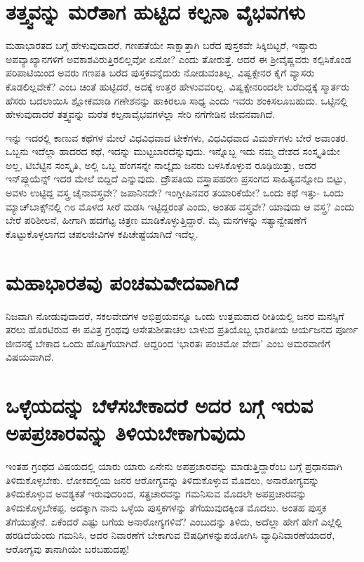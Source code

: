 \section*{ತತ್ತ್ವವನ್ನು ಮರೆತಾಗ ಹುಟ್ಟಿದ ಕಲ್ಪನಾ ವೈಭವಗಳು}

ಮಹಾಭಾರತದ ಬಗ್ಗೆ ಹೇಳುವುದಾದರೆ, ಗಣಪತೆಯೇ ಸಾಕ್ಷಾತ್ತಾಗಿ ಬರೆದ ಪುಸ್ತಕವೇ ಸಿಕ್ಕಿಬಿಟ್ಟರೆ, ಇಷ್ಟಾರು ಅಪವ್ಯಾಖ್ಯಾನಗಳಿಗೆ ಅವಕಾಶವಿರುತ್ತಿರಲಿಲ್ಲವೋ ಏನೋ? ಎಂದು ತೋರುತ್ತೆ. ಆದರೆ ಈ ಶ್ರೀವೈಷ್ಣವರು ಕಲ್ಪಿಸಿಕೊಂಡ ಪರಿಪಾಟಿಯಿಂದ ಅವರು ಗಣಪತಿ ಬರೆದ ಪುಸ್ತಕವನ್ನೆದುರು ನೋಡುವಂತಿಲ್ಲ. ವಿಷ್ವಕ್ಸೇನರ ಕೈಗೆ ವ್ಯಾಸರು ಕೊಡಲಿಲ್ಲವೇಕೆ? ಎಂಬ ಚಿಂತೆ ಹುಟ್ಟಿದರೆ, ಅದಕ್ಕೆ ಉತ್ತರ ಹೇಳುವವರಿಲ್ಲ. ವಿಷ್ವಕ್ಸೇನರಿಂದಲೇ ಬರೆದಿದ್ದಕ್ಕೆ ಸ್ಮಾರ್ತರು ಹೆಸರು ಬದಲಾಯಿಸಿ ಶ್ಲೋಕಮಾಡಿ ಗಣೇಶನನ್ನು ಹಾಕಿರಲೂ ಸಾಧ್ಯ ಎಂದು ಇವರು ಶಂಕಿಸಲೂಬಹುದು. ಒಟ್ಟಿನಲ್ಲಿ ಹೇಳುವುದಾದರೆ ತತ್ತ್ವವನ್ನು ಮರೆತ ಕಲ್ಪನಾವೈಭವಗಳೆಲ್ಲಾ ಸೇರಿ ನಗೆಗೇಡಿನ ಜೀವನವಾಗಿದೆ.

ಇನ್ನು ಇದರಲ್ಲಿ ಕಾಣುವ ಕಥೆಗಳ ಮೇಲೆ ವಿಧವಿಧವಾದ ಟೀಕೆಗಳು, ವಿಧವಿಧವಾದ ವಿಮರ್ಶೆಗಳು ಬೇರೆ ಅವಾಂತರ. ಒಬ್ಬನು ಇದೆಲ್ಲಾ ಹಾದರದ ಕಥೆ, ಇದನ್ನು ಮುಟ್ಟಬಾರದೆನ್ನುವುದು. ಇನ್ನೊಬ್ಬ ಇದು ನಮ್ಮ ದೇಶದ ಸಂಸ್ಕೃತಿಯೇ ಅಲ್ಲ, ಟಿಬೆಟ್ಟಿನ ಸಂಸ್ಕೃತಿ, ಅಲ್ಲಿ ಒಬ್ಬ ಹೆಂಗಸನ್ನೇ ನಾಲ್ಕೈದು ಜನರು ಬಳಸಿಕೊಳ್ಳುವ ರೂಢಿಯಿತ್ತು, ಅದರ ಇನ್‌ಪ್ಲುಯೆನ್ಸ್ ಇದರ ಮೇಲೆ ಬಿದ್ದಿದೆ ಎನ್ನುವುದು. ದ್ರೌಪತಿಯ ವಸ್ತ್ರಾಪಹರಣ ಪ್ರಸಂಗದ ಸಾಹಿತ್ಯವನ್ನೋದಿ ಬಿಟ್ಟು, ಅವಳು ಉಟ್ಟಿದ್ದ ವಸ್ತ್ರ ಚೈನಾವಸ್ತ್ರವೇ? ಜಪಾನಿನದೇ? ಇಂಗ್ಲೀಷಿನವರ ತಯಾರಿಕೆಯೇ? ಒಂದು ಕಥೆ ಇತ್ತು- ಒಂದು ಮ್ಯಾಚ್‌ಬಾಕ್ಸ್‌ನಲ್ಲಿ ೧೮ ಮೊಳದ ಸೀರೆ ಮಡಸಿ ಇಟ್ಟಿದ್ದರಂತೆ ಎಂದು, ಅಂತಹ ವಸ್ತ್ರವೇ? ಯಾವುದು ಆ ವಸ್ತ್ರ? ಎಂದು ಬೇರೆ ಪರಿಶೀಲನೆ, ಹೀಗಾಗಿ ಹದಗೆಟ್ಟ ಚಿತ್ರಣ ಮಾಡಿಕೊಳ್ಳುತ್ತಿದ್ದಾರೆ. ಮೈ ಮನಗಳನ್ನು ಸತ್ಯಾನ್ವೇಷಣೆಗೆ ಕೊಟ್ಟುಕೊಳ್ಳಲಾಗದ ಚಪಲಜೀವಿಗಳ ಕಪಿಚೇಷ್ಟೆಯಾಗಿದೆ ಇದೆಲ್ಲ.

\section*{ಮಹಾಭಾರತವು ಪಂಚಮವೇದವಾಗಿದೆ}

ನಿಜವಾಗಿ ನೋಡುವುದಾದರೆ, ಸಕಲವೇದಗಳ ಅಭಿಪ್ರಯವನ್ನೂ ಒಂದು ಉತ್ತಮವಾದ ರೀತಿಯಲ್ಲಿ ಜನರ ಮನಸ್ಸಿಗೆ ತರಲು ಹೊರಟಿರುವ ಈ ಪವಿತ್ರ ಗ್ರಂಥವು ಆಸೇತುಶೀತಾಚಲ ಬಾಳುವ ಪ್ರತಿಯೊಬ್ಬ ಭಾರತೀಯ ಆರ್ಯಜನದ ಪೂರ್ಣ ಜೀವನಕ್ಕೆ ಬೇಕಾದ ಒಂದು ಹೊತ್ತಿಗೆಯಾಗಿದೆ. ಆದ್ದರಿಂದ `ಭಾರತಃ ಪಂಚಮೋ ವೇದಃ'\label{122} ಎಂಬ ಅಮರವಾಣಿಗೆ ವಿಷಯವಾಗಿದೆ.

\section*{ಒಳ್ಳೆಯದನ್ನು ಬೆಳೆಸಬೇಕಾದರೆ ಅದರ ಬಗ್ಗೆ ಇರುವ ಅಪಪ್ರಚಾರವನ್ನು ತಿಳಿಯಬೇಕಾಗುವುದು}

ಇಂತಹ ಗ್ರಂಥದ ವಿಷಯದಲ್ಲಿ ಯಾರು ಯಾರು ಏನೇನು ಅಪಪ್ರಚಾರವನ್ನು ಮಾಡುತ್ತಿದ್ದಾರೆಂಬ ಬಗ್ಗೆ ಪ್ರಧಾನವಾಗಿ ತಿಳಿದುಕೊಳ್ಳಬೇಕು. ಲೋಕದಲ್ಲಿಯ ಜನರ ಆರೋಗ್ಯವನ್ನು ತಿಳಿದುಕೊಳ್ಳುವ ಮೊದಲು, ಅನಾರೋಗ್ಯವನ್ನು ತಿಳಿದುಕೊಳ್ಳುವ ಅವಶ್ಯಕತೆ ಇರುವುದರಿಂದ, ಸತ್ಪ್ರಚಾರವನ್ನು ಗಮನಿಸುವ ಮೊದಲೇ ಅಪಪ್ರಚಾರವನ್ನು ತಿಳಿದುಕೊಳ್ಳಬೇಕಪ್ಪ. ಅದಕ್ಕಾಗಿ ನಾನು ಒಳ್ಳೆಯ ಪುಸ್ತಕಗಳನ್ನು ತೆಗೆಯುವುದಕ್ಕಿಂತ ಮೊದಲು. ಅಂತಹ ಪುಸ್ತಕ ತೆಗೆಯುತ್ತೇನೆ. ಏಕೆಂದರೆ ಎಷ್ಟು ಬಗೆಯ ಅನಾರೋಗ್ಯಗಳಿವೆ? ಎಂಬುದನ್ನು ತಿಳಿದು, ಅದೆಲ್ಲಾ ಹೇಗೆ ಹೇಗೆ ಎಲ್ಲೆಲ್ಲಿ ಹರಡಿದೆಯೆಂದು ಗಮನಿಸಿ, ಅದರ ನಿವಾರಣೆಗೆ ಬೇಕಾಗುವ ಔಷಧಿಗಳನ್ನುಪಯೋಗಿಸಿ ವ್ಯಾಧಿನಿವಾರಣೆಯಾದರೆ, ಆರೋಗ್ಯವು ತಾನಾಗಿಯೇ ಬರಬಹುದಪ್ಪ!

